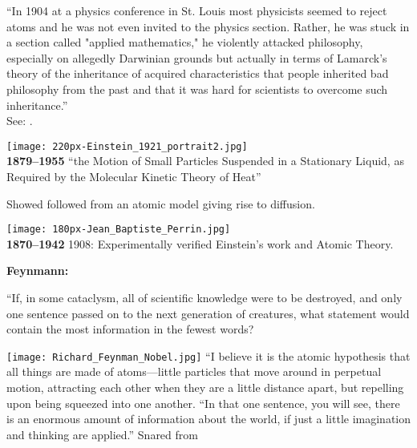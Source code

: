     \small
    ``In 1904 at a physics conference in St. Louis most
    physicists seemed to reject atoms and he was not even invited
    to the physics section.
    {
      Rather, he was stuck in a section
      called "applied mathematics,"} 
    {
      he violently attacked
      philosophy, especially on allegedly Darwinian grounds
      }
    {
      but
      actually in terms of Lamarck's theory of the inheritance of
      acquired characteristics that people inherited bad philosophy
      }
    {
      from the past and that it was hard for scientists to overcome
      such inheritance.''
    }
    \\
    {\mbox{} \hfill
      See: .}
    
    \texttt{[image: 220px-Einstein\_1921\_portrait2.jpg]}\\
    
    \textbf{
    1879--1955}
       ``the Motion of Small Particles Suspended in a Stationary Liquid, as Required by the Molecular Kinetic Theory of Heat''\cite{einstein1905a,einstein1956a}
     
      Showed  
      followed from an atomic model giving rise to diffusion.
  

  \medskip
    
    \texttt{[image: 180px-Jean\_Baptiste\_Perrin.jpg]}\\
    
    \textbf{
        1870--1942}
        1908: Experimentally verified Einstein's work and Atomic Theory.
  
  \small

  \textbf{Feynmann:}
      
      ``If, in some cataclysm, all of scientific knowledge were to be
      destroyed, and only one sentence passed on to the next generation of
      creatures, what statement would contain the most information in the
      fewest words?
      
      \texttt{[image: Richard\_Feynman\_Nobel.jpg]}
    \smallskip
    {
      ``I believe it is the atomic hypothesis that all things
      are made of atoms}{---little particles that move around in perpetual
      motion, attracting each other when they are a little distance apart,
      but repelling upon being squeezed into one another.
    } 
    {
      ``In that one
      sentence, you will see, there is an enormous amount of information
      about the world, if just a little imagination and thinking are
      applied.''
    }
\tiny
Snared from 

